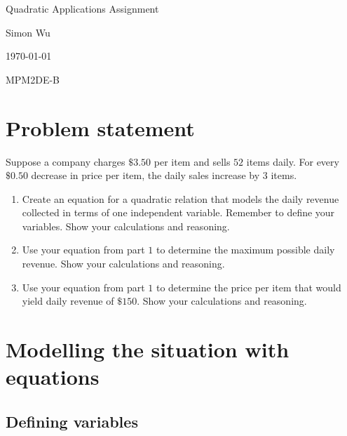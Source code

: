 \documentclass[12pt]{article}
\begin{document}
\begin{titlepage}

\begin{center}
    \Huge{Quadratic Applications Assignment}
    
    \vspace{0.5in}
    
    \Large{Simon Wu}
    
    \Large{\today}
    
    \vspace{0.5in}
    
    \Large{MPM2DE-B}

    
\end{center}

\section*{Problem statement}

\begin{displayquote}

Suppose a company charges $\$3.50$ per item and sells $52$ items daily. For every $\$0.50$ decrease in price per item, the daily sales increase by $3$ items.

\begin{enumerate}
\item Create an equation for a quadratic relation that models the daily revenue collected in terms of one independent variable. Remember to define your variables. Show your calculations and reasoning.
\item Use your equation from part $1$ to determine the maximum possible daily revenue. Show your calculations and reasoning.
\item Use your equation from part $1$ to determine the price per item that would yield daily revenue of $\$150$. Show your calculations and reasoning.
\end{enumerate}

\end{displayquote}

\tableofcontents

\end{titlepage}

\section{Modelling the situation with equations}

\subsection{Defining variables}
\end{document}
